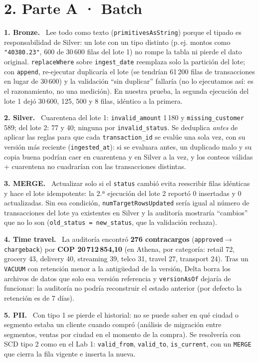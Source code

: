\documentclass[10pt,a4paper]{article}
\newcommand{\q}[1]{\par\smallskip\textbf{#1}\ }
\newcommand{\code}[1]{\texttt{\small #1}}
\begin{document}
\section*{2. Parte A · Batch}
\q{1. Bronze.} Lee todo como texto (\code{primitivesAsString}) porque el tipado es responsabilidad de Silver: un lote con un tipo distinto (p.\,ej. montos como \code{"40380.23"}, 600 de 30\,600 filas del lote 1) no rompe la tabla ni pierde el dato original. \code{replaceWhere} sobre \code{ingest\_date} reemplaza solo la partición del lote; con \code{append}, re-ejecutar duplicaría el lote (se tendrían 61\,200 filas de transacciones en lugar de 30\,600) y la validación ``sin duplicar'' fallaría (no lo ejecutamos así: es el razonamiento, no una medición). En nuestra prueba, la segunda ejecución del lote 1 dejó 30\,600, 125, 500 y 8 filas, idéntico a la primera.

\q{2. Silver.} Cuarentena del lote 1: \code{invalid\_amount} 1\,180 y \code{missing\_customer} 589; del lote 2: 77 y 40; ninguna por \code{invalid\_status}. Se deduplica \emph{antes} de aplicar las reglas para que cada \code{transaction\_id} se evalúe una sola vez, con su versión más reciente (\code{ingested\_at}): si se evaluara antes, un duplicado malo y su copia buena podrían caer en cuarentena y en Silver a la vez, y los conteos válidas + cuarentena no cuadrarían con las transacciones distintas.

\q{3. MERGE.} Actualizar solo si el \code{status} cambió evita reescribir filas idénticas y hace el lote idempotente: la 2.ª ejecución del lote 2 reportó 0 insertadas y 0 actualizadas. Sin esa condición, \code{numTargetRowsUpdated} sería igual al número de transacciones del lote ya existentes en Silver y la auditoría mostraría ``cambios'' que no lo son (\code{old\_status = new\_status}, que la validación rechaza).

\q{4. Time travel.} La auditoría encontró \textbf{276 contracargos} (\code{approved}$\to$\code{chargeback}) por \textbf{COP 20\,712\,854,10} (en Athena, por categoría: retail 72, grocery 43, delivery 40, streaming 39, telco 31, travel 27, transport 24). Tras un \code{VACUUM} con retención menor a la antigüedad de la versión, Delta borra los archivos de datos que solo esa versión referencia y \code{versionAsOf} dejaría de funcionar: la auditoría no podría reconstruir el estado anterior (por defecto la retención es de 7 días).

\q{5. PII.} Con tipo 1 se pierde el historial: no se puede saber en qué ciudad o segmento estaba un cliente cuando compró (análisis de migración entre segmentos, ventas por ciudad en el momento de la compra). Se resolvería con SCD tipo 2 como en el Lab 1: \code{valid\_from}, \code{valid\_to}, \code{is\_current}, con un \code{MERGE} que cierra la fila vigente e inserta la nueva.
\end{document}
